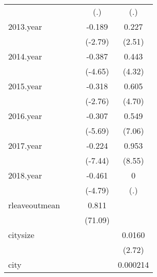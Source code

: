 {\begin{tabular}{l*{4}{c}}
            &                     &                     &         (.)         &         (.)         \\
[1em]
2013.year   &                     &                     &      -0.189\sym{**} &       0.227\sym{*}  \\
            &                     &                     &     (-2.79)         &      (2.51)         \\
[1em]
2014.year   &                     &                     &      -0.387\sym{***}&       0.443\sym{***}\\
            &                     &                     &     (-4.65)         &      (4.32)         \\
[1em]
2015.year   &                     &                     &      -0.318\sym{**} &       0.605\sym{***}\\
            &                     &                     &     (-2.76)         &      (4.70)         \\
[1em]
2016.year   &                     &                     &      -0.307\sym{***}&       0.549\sym{***}\\
            &                     &                     &     (-5.69)         &      (7.06)         \\
[1em]
2017.year   &                     &                     &      -0.224\sym{***}&       0.953\sym{***}\\
            &                     &                     &     (-7.44)         &      (8.55)         \\
[1em]
2018.year   &                     &                     &      -0.461\sym{***}&           0         \\
            &                     &                     &     (-4.79)         &         (.)         \\
[1em]
rleaveoutmean&                     &                     &       0.811\sym{***}&                     \\
            &                     &                     &     (71.09)         &                     \\
[1em]
citysize    &                     &                     &                     &      0.0160\sym{**} \\
            &                     &                     &                     &      (2.72)         \\
[1em]
city        &                     &                     &                     &    0.000214\sym{***}\\

\end{tabular}}
